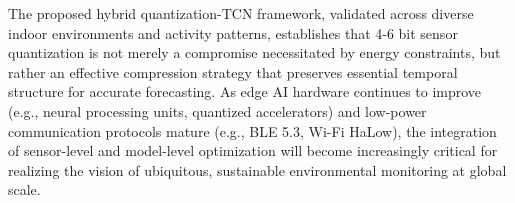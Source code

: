 The proposed hybrid quantization-TCN framework, validated across diverse indoor environments and activity patterns, establishes that 4-6 bit sensor quantization is not merely a compromise necessitated by energy constraints, but rather an effective compression strategy that preserves essential temporal structure for accurate forecasting. As edge AI hardware continues to improve (e.g., neural processing units, quantized accelerators) and low-power communication protocols mature (e.g., BLE 5.3, Wi-Fi HaLow), the integration of sensor-level and model-level optimization will become increasingly critical for realizing the vision of ubiquitous, sustainable environmental monitoring at global scale.